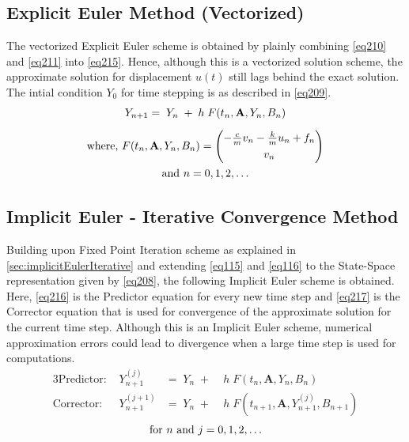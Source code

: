 \subsection{Explicit Euler Method (Vectorized)}
The vectorized Explicit Euler scheme is obtained by plainly combining \cref{eq210} and \cref{eq211} into \cref{eq215}. Hence, although this is a vectorized solution scheme, the approximate solution for displacement $u(t)$ still lags behind the exact solution. The intial condition $Y_0$ for time stepping is as described in \cref{eq209}.
\begin{gather}\label{eq215}
Y_{n+1} =\; Y_{n} \;+ \; h \; F(t_n, \mathbf{A}, Y_{n}, B_{n})\\[5pt]
\text{where, }
F(t_n, \mathbf{A}, Y_{n}, B_{n})
=
\begin{pmatrix}
-\frac{c}{m} v_{n} - \frac{k}{m} u_{n} + f_{n} \\[3pt] 
v_{n} 
\end{pmatrix}\notag \\
\text{and }
 n = 0, 1, 2, \hdots \notag
\end{gather}

\subsection{Implicit Euler - Iterative Convergence Method}
Building upon Fixed Point Iteration scheme as explained in \cref{sec:implicitEulerIterative} and extending \cref{eq115} and \cref{eq116} to the State-Space representation given by \cref{eq208}, the following Implicit Euler scheme is obtained. Here, \cref{eq216} is the Predictor equation for every new time step and \cref{eq217} is the Corrector equation  that is used for convergence of the approximate solution for the current time step. Although this is an Implicit Euler scheme, numerical approximation errors could lead to divergence when a large time step is used for computations.
\begin{alignat}{3}
\text{Predictor: }& Y_{n+1}^{(j)} &=\; Y_{n} \;+ \;& h \; F(t_n, \mathbf{A}, Y_{n}, B_{n})\label{eq216}\\[0pt]
\text{Corrector: }& Y_{n+1}^{(j+1)} &=\; Y_{n} \;+ \;& h \; F(t_{n+1}, \mathbf{A}, Y_{n+1}^{(j)}, B_{n+1})\label{eq217}
\end{alignat}
\begin{equation}
\text{for } n \text{ and } j= 0, 1, 2, \hdots \notag \\[0pt]
\end{equation}

